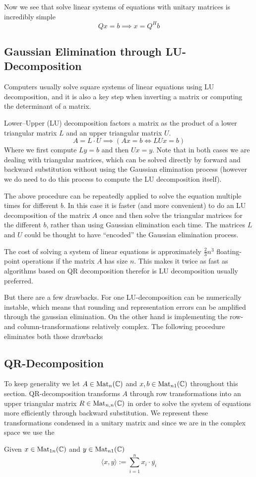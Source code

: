 Now we see that solve linear systems of equations with unitary matrices is incredibly simple
\[Qx = b \implies x = Q^H b\]


\subsection{Gaussian Elimination through LU-Decomposition}
Computers usually solve square systems of linear equations using LU decomposition, and it is also a key step when inverting a matrix or computing the determinant of a matrix.

Lower–Upper (LU) decomposition factors a matrix as the product of a lower triangular matrix \(L\) and an upper triangular matrix \(U\).
\[A = L \cdot U \implies (Ax = b \iff LUx = b)\]
Where we first compute \(Ly = b\) and then \(Ux = y\).
Note that in both cases we are dealing with triangular matrices, which can be solved directly by forward and backward substitution without using the Gaussian elimination process (however we do need to do this process to compute the LU decomposition itself).

The above procedure can be repeatedly applied to solve the equation multiple times for different \(b\).
In this case it is faster (and more convenient) to do an LU decomposition of the matrix \(A\) once and then solve the triangular matrices for the different \(b\), rather than using Gaussian elimination each time.
The matrices \(L\) and \(U\) could be thought to have ``encoded'' the Gaussian elimination process.

The cost of solving a system of linear equations is approximately \(\frac{2}{3}n^3\) floating-point operations if the matrix \(A\) has size \(n\).
This makes it twice as fast as algorithms based on QR decomposition therefor is LU decomposition usually preferred.

But there are a few drawbacks.
For one LU-decomposition can be numerically instable, which means that rounding and representation errors can be amplified through the gaussian elimination.
On the other hand is implementing the row- and column-transformations relatively complex.
The following procedure eliminates both those drawbacks

\subsection{QR-Decomposition}
To keep generality we let \(A \in \operatorname{Mat}_n(\mathbb{C})\) and \(x, b \in \operatorname{Mat}_{n1}(\mathbb{C})\) throughout this section.
QR-decomposition transforms \(A\) through row transformations into an upper triangular matrix \(R \in \operatorname{Mat}_{n,n}(\mathbb{C})\) in order to solve the system of equations more efficiently through backward substitution.
We represent these transformations condensed in a unitary matrix and since we are in the complex space we use the
\begin{definition}\label{def:complex_dot_prod}
   Given \(x \in \operatorname{Mat}_{1n}(\mathbb{C})\) and \(y \in \operatorname{Mat}_{n1}(\mathbb{C})\)
   \[\langle x, y \rangle := \sum_{i = 1}^n x_i \cdot \overline{y_i}\]
\end{definition}

